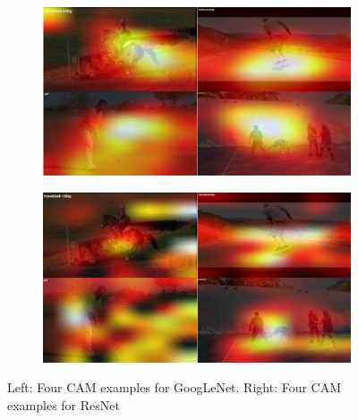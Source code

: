 \documentclass[11pt]{report}
\begin{document}
\begin{figure}
    \centering
    \begin{subfigure}{0.5\textwidth}
        \includegraphics[scale=0.1]{CAMsGoogLeNet}
    \end{subfigure}
    \hfill %
    \begin{subfigure}{0.5\textwidth}
        \includegraphics[scale=0.1]{CAMsResNet}
      \end{subfigure}
      \caption{Left: Four CAM examples for GoogLeNet. Right: Four CAM examples
        for ResNet}
      \label{CAMImages}
    \end{figure}
\end{document}
